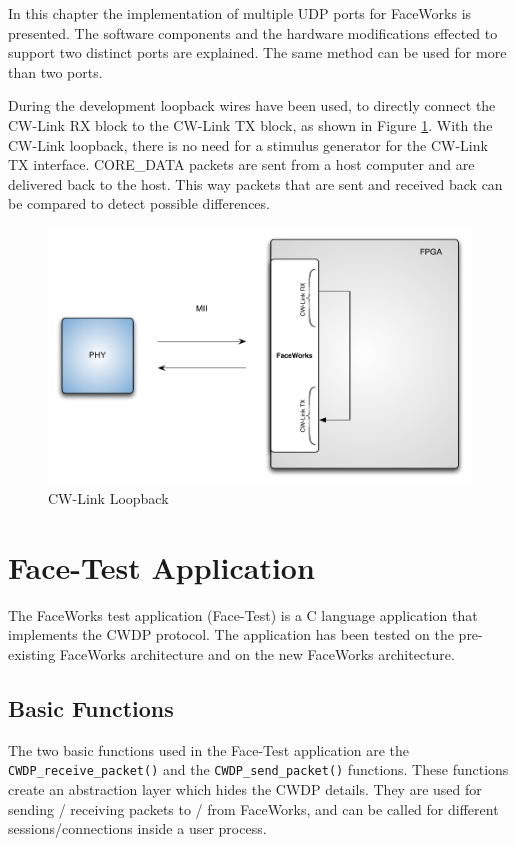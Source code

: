 \documentclass[defaultstyle,10pt,master,Helvetica]{thesis}
\begin{document}
In this chapter the implementation of multiple \ac{UDP} ports for FaceWorks is presented. The software components and the hardware modifications effected to support two distinct ports are explained. The same method can be used for more than two ports.

During the development loopback wires have been used, to directly connect the CW-Link RX block to the CW-Link TX block, as shown in Figure \ref{fig:CW-LoopBack}. With the CW-Link loopback, there is no need for a stimulus generator for the CW-Link TX interface. CORE\_DATA packets are sent from a host computer and are delivered back to the host. This way packets that are sent and received back can be compared to detect possible differences.

\begin{figure}[h]
  \centering
      \includegraphics[scale=0.70]{Diagrams/CW-LoopBack.pdf}
  \caption{CW-Link Loopback}\label{fig:CW-LoopBack}
\end{figure}



\section{Face-Test Application}

The FaceWorks test application (Face-Test) is a C language application that implements the \ac{CWDP} protocol. The application has been tested on the pre-existing FaceWorks architecture and on the new FaceWorks architecture.

\subsection{Basic Functions}
The two basic functions used in the Face-Test application are the {\tt CWDP\_receive\_packet()} and the {\tt CWDP\_send\_packet()} functions. These functions create an abstraction layer which hides the \ac{CWDP} details. They are used for sending / receiving packets to / from FaceWorks, and can be called for different sessions/connections inside a user process.
\end{document}
